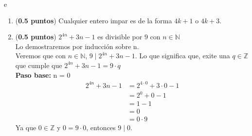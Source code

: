 e\documentclass[fontsize=12pt]{scrartcl}
\begin{document}
\begin{enumerate}
		\item ({\bf 0.5 puntos})
		Cualquier entero impar es de la forma $4k + 1$ o $4k + 3$.

		\item ({\bf 0.5 puntos}) 
	          $2^{4n} + 3n - 1$ es divisible por $9$  con $n \in \mathbb{N}$ \\
                  Lo demostraremos por inducción sobre n. \\
                  Veremos que con $n \in \mathbb{N}$, $9 \mid 2^{4n} + 3n - 1$. Lo que significa que, exite una $q \in \mathbb{Z} $ que cumple que $2^{4n} + 3n - 1 = 9 \cdot q$ \\
                  \textbf {Paso base:} n = 0 \\
                   \begin{equation*}
                  \begin{split}
                    2^{4n} + 3n - 1 &= 2^{4\cdot 0} + 3 \cdot 0 - 1 \\
                    &= 2^{0} + 0 - 1 \\
                    &= 1 -1 \\
                    &= 0 \\
                    &= 0 \cdot 9
                  \end{split}
                   \end{equation*}
                   Ya que $0 \in \mathbb{Z}$ y $0 = 9 \cdot 0$, entonces $9 \mid 0$.


\end{enumerate}
\end{document}
